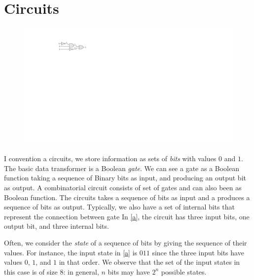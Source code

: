 \section{Circuits}
\begin{figure}
\includegraphics[]{Figures/HWCircuits/DigitalCircuit}
\end{figure}
I convention a circuits, we store information as sets of {\it bits} with values $0$ and $1$.
%
The basic data transformer is a Boolean {\it gate}.
%
We can see a gate as a Boolean function taking a sequence of Binary bits as input, and producing an output bit as output.
%
A combinatorial circuit consists of set of gates and can also been as Boolean function.
%
The circuits takes a sequence of bits as input and a produces a sequence of bits as output.
%
Typically, we also have a set of internal bits that represent the connection between gate
%
In \cref{a}, the circuit has three input bits,  one output bit, and three internal bits.

Often, we consider the {\it state} of a sequence of bits by giving the sequence of their values.
%
For instance, the input state in \cref{a} is $011$ since the three input bits have values $0$, $1$, and $1$ in that order.
%
We observe that the set of the input states in this case is of size $8$: in general, $n$ bits may have $2^n$ possible states.
